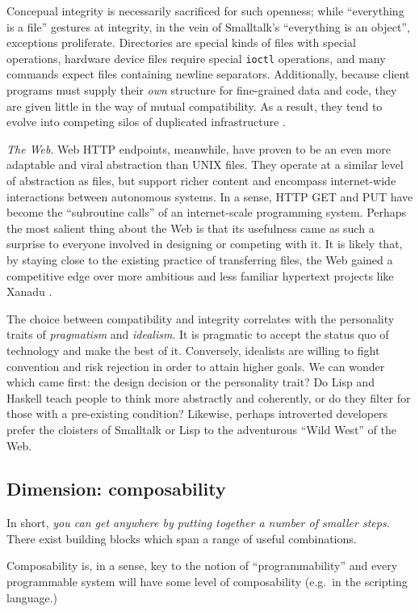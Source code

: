 \documentclass[ twoside,openright,titlepage,numbers=noenddot,headinclude,footinclude,cleardoublepage=empty,abstract=on,
                BCOR=5mm,paper=a4,fontsize=11pt
                ]{scrreprt}
\newcommand{\note}[1]{}
\theoremstyle{definition}
\begin{document}
Concepual integrity is necessarily sacrificed for such openness; while
``everything is a file'' gestures at integrity, in the vein of
Smalltalk's ``everything is an object'', exceptions proliferate.
Directories are special kinds of files with special operations, hardware
device files require special \texttt{ioctl} operations, and many
commands expect files containing newline separators. Additionally,
because client programs must supply their \emph{own} structure for
fine-grained data and code, they are given little in the way of mutual
compatibility. As a result, they tend to evolve into competing silos of
duplicated infrastructure \parencite{KellOS,Mythical}.

\emph{The Web}. Web HTTP endpoints, meanwhile, have proven to be an even
more adaptable and viral abstraction than UNIX files. They operate at a
similar level of abstraction as files, but support richer content and
encompass internet-wide interactions between autonomous systems. In a
sense, HTTP GET and PUT have become the ``subroutine calls'' of an
internet-scale programming system. Perhaps the most salient thing about
the Web is that its usefulness came as such a surprise to everyone
involved in designing or competing with it. It is likely that, by
staying close to the existing practice of transferring files, the Web
gained a competitive edge over more ambitious and less familiar
hypertext projects like Xanadu \parencite{TedNelson}.

The choice between compatibility and integrity correlates with the
personality traits of \emph{pragmatism} and \emph{idealism}. It is
pragmatic to accept the status quo of technology and make the best of
it. Conversely, idealists are willing to fight convention and risk
rejection in order to attain higher goals. We can wonder which came
first: the design decision or the personality trait? Do Lisp and Haskell
teach people to think more abstractly and coherently, or do they filter
for those with a pre-existing condition? Likewise, perhaps introverted
developers prefer the cloisters of Smalltalk or Lisp to the adventurous
``Wild West'' of the Web.

\hypertarget{dimension-composability}{\subsection{Dimension: composability}\label{dimension-composability}}

In short, \emph{you can get anywhere by putting together a number of
smaller steps.} There exist building blocks which span a range of useful
combinations.
\note{JE. LEGOs might be a more friendly example than Linear Algebra.
Such a property can be analogised to *linear independence* in mathematical vector spaces: a number of primitives (basis vectors) whose possible combinations span a meaningful space.}
Composability is, in a sense, key to the notion of ``programmability''
and every programmable system will have some level of composability
(e.g.~in the scripting language.)
\end{document}
